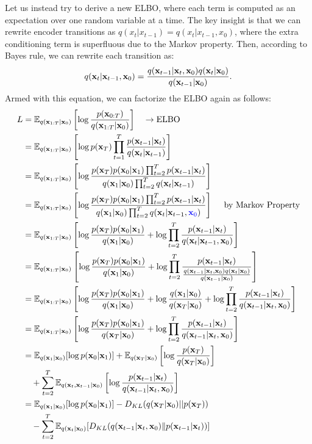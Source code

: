 Let us instead try to derive a new ELBO, where each term is computed as an expectation over \textbfonly one random variable at a time. The key insight is that we can rewrite encoder transitions as $q(x_t|x_{t-1}) = q(x_t|x_{t-1}, x_0)$, where the extra conditioning term is superfluous due to the Markov property. Then, according to Bayes rule, we can rewrite each transition as:
\begin{align*}
	q({\mathbf{x}}_t|{\mathbf{x}}_{t-1}, {\mathbf{x}}_0)= \frac{q({\mathbf{x}}_{t-1}|{\mathbf{x}}_t, {\mathbf{x}}_0)q({\mathbf{x}}_t| {\mathbf{x}}_0)}{q({\mathbf{x}}_{t-1}| {\mathbf{x}}_0)}.
\end{align*}
Armed with this equation, we can factorize the ELBO again as follows:
\begin{align}
	L 
	&= \mathbb{E}_{q({\mathbf{x}}_{1:T}|{\mathbf{x}}_0)}\left[\log\frac{p({\mathbf{x}}_{0:T})}{q({\mathbf{x}}_{1:T}|{\mathbf{x}}_0)}\right] \quad \to \textrm{ELBO}\\		
	&= \mathbb{E}_{q({\mathbf{x}}_{1:T}|{\mathbf{x}}_0)}\left[\log p({\mathbf{x}}_T)\prod_{t=1}^T\frac{p({\mathbf{x}}_{t-1}|{\mathbf{x}}_t)}{q({\mathbf{x}}_{t}|{\mathbf{x}}_{t-1})}\right]\\
	&= \mathbb{E}_{q({\mathbf{x}}_{1:T}|{\mathbf{x}}_0)}\left[\log \frac{p({\mathbf{x}}_T)p({\mathbf{x}}_0|{\mathbf{x}}_{1})\prod_{t=2}^{T} p({\mathbf{x}}_{t-1}|{\mathbf{x}}_{t})}{q({\mathbf{x}}_1|{\mathbf{x}}_{0})\prod_{t=2}^{T}  q({\mathbf{x}}_{t}|{\mathbf{x}}_{t-1})}\right]\\
	&= \mathbb{E}_{q({\mathbf{x}}_{1:T}|{\mathbf{x}}_0)}\left[\log \frac{p({\mathbf{x}}_T)p({\mathbf{x}}_0|{\mathbf{x}}_{1})\prod_{t=2}^{T} p({\mathbf{x}}_{t-1}|{\mathbf{x}}_{t})}{q({\mathbf{x}}_1|{\mathbf{x}}_{0})\prod_{t=2}^{T}  q({\mathbf{x}}_{t}|{\mathbf{x}}_{t-1}, \textcolor{blue}{{\mathbf{x}}_0})}\right] \quad \textrm{ by Markov Property}\\
	&= \mathbb{E}_{q({\mathbf{x}}_{1:T}|{\mathbf{x}}_0)}\left[\log \frac{p({\mathbf{x}}_T)p({\mathbf{x}}_0|{\mathbf{x}}_{1})}{q({\mathbf{x}}_1|{\mathbf{x}}_{0})}+\log \prod_{t=2}^{T}\frac{ p({\mathbf{x}}_{t-1}|{\mathbf{x}}_{t})}{q({\mathbf{x}}_{t}|{\mathbf{x}}_{t-1}, {\mathbf{x}}_0)}\right]\\
	&= \mathbb{E}_{q({\mathbf{x}}_{1:T}|{\mathbf{x}}_0)}\left[\log \frac{p({\mathbf{x}}_T)p({\mathbf{x}}_0|{\mathbf{x}}_{1})}{q({\mathbf{x}}_1|{\mathbf{x}}_{0})}+\log \prod_{t=2}^{T}\frac{ p({\mathbf{x}}_{t-1}|{\mathbf{x}}_{t})}{\frac{q({\mathbf{x}}_{t-1}|{\mathbf{x}}_t, {\mathbf{x}}_0)q({\mathbf{x}}_t| {\mathbf{x}}_0)}{q({\mathbf{x}}_{t-1}| {\mathbf{x}}_0)}}\right]\\
	&= \mathbb{E}_{q({\mathbf{x}}_{1:T}|{\mathbf{x}}_0)}\left[\log \frac{p({\mathbf{x}}_T)p({\mathbf{x}}_0|{\mathbf{x}}_{1})}{q({\mathbf{x}}_1|{\mathbf{x}}_{0})}+\log \frac{q({\mathbf{x}}_1|{\mathbf{x}}_0)}{q({\mathbf{x}}_T|{\mathbf{x}}_0)}+\log \prod_{t=2}^{T}\frac{ p({\mathbf{x}}_{t-1}|{\mathbf{x}}_{t})}{q({\mathbf{x}}_{t-1}|{\mathbf{x}}_t, {\mathbf{x}}_0)}\right]\\
	&= \mathbb{E}_{q({\mathbf{x}}_{1:T}|{\mathbf{x}}_0)}\left[\log \frac{p({\mathbf{x}}_T)p({\mathbf{x}}_0|{\mathbf{x}}_{1})}{q({\mathbf{x}}_T|{\mathbf{x}}_{0})}+\log \prod_{t=2}^{T}\frac{ p({\mathbf{x}}_{t-1}|{\mathbf{x}}_{t})}{q({\mathbf{x}}_{t-1}|{\mathbf{x}}_t, {\mathbf{x}}_0)}\right]\\
	&= \mathbb{E}_{q({\mathbf{x}}_{1}|{\mathbf{x}}_0)}[\log p({\mathbf{x}}_0|{\mathbf{x}}_{1})]+\mathbb{E}_{q({\mathbf{x}}_{T}|{\mathbf{x}}_0)}\left[\log \frac{p({\mathbf{x}}_T)}{q({\mathbf{x}}_T|{\mathbf{x}}_{0})}\right]\\ 
	&\quad+\sum_{t=2}^{T}\mathbb{E}_{q({\mathbf{x}}_{t},{\mathbf{x}}_{t-1}|{\mathbf{x}}_0)}\left[\log\frac{ p({\mathbf{x}}_{t-1}|{\mathbf{x}}_{t})}{q({\mathbf{x}}_{t-1}|{\mathbf{x}}_t, {\mathbf{x}}_0)}\right]\\
	&= \mathbb{E}_{q({\mathbf{x}}_{1}|{\mathbf{x}}_0)}[\log p({\mathbf{x}}_0|{\mathbf{x}}_{1})]-D_{KL}(q({\mathbf{x}}_{T}|{\mathbf{x}}_0)||p({\mathbf{x}}_T))\\
	&\quad -\sum_{t=2}^{T}\mathbb{E}_{q({\mathbf{x}}_{t}|{\mathbf{x}}_0)}[D_{KL}(q({\mathbf{x}}_{t-1}|{\mathbf{x}}_t, {\mathbf{x}}_0)\|p({\mathbf{x}}_{t-1}|{\mathbf{x}}_{t}))]
\end{align}

